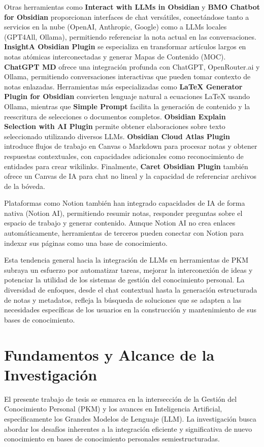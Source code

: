 Otras herramientas como \textbf{Interact with LLMs in Obsidian} y \textbf{BMO Chatbot for Obsidian} proporcionan interfaces de chat versátiles, conectándose tanto a servicios en la nube (OpenAI, Anthropic, Google) como a LLMs locales (GPT4All, Ollama), permitiendo referenciar la nota actual en las conversaciones. \textbf{InsightA Obsidian Plugin} se especializa en transformar artículos largos en notas atómicas interconectadas y generar Mapas de Contenido (MOC). \textbf{ChatGPT MD} ofrece una integración profunda con ChatGPT, OpenRouter.ai y Ollama, permitiendo conversaciones interactivas que pueden tomar contexto de notas enlazadas. Herramientas más especializadas como \textbf{LaTeX Generator Plugin for Obsidian} convierten lenguaje natural a ecuaciones LaTeX usando Ollama, mientras que \textbf{Simple Prompt} facilita la generación de contenido y la reescritura de selecciones o documentos completos. \textbf{Obsidian Explain Selection with AI Plugin} permite obtener elaboraciones sobre texto seleccionado utilizando diversos LLMs. \textbf{Obsidian Cloud Atlas Plugin} introduce flujos de trabajo en Canvas o Markdown para procesar notas y obtener respuestas contextuales, con capacidades adicionales como reconocimiento de entidades para crear wikilinks. Finalmente, \textbf{Caret Obsidian Plugin} también ofrece un Canvas de IA para chat no lineal y la capacidad de referenciar archivos de la bóveda.

Plataformas como Notion también han integrado capacidades de IA de forma nativa (Notion AI), permitiendo resumir notas, responder preguntas sobre el espacio de trabajo y generar contenido. Aunque Notion AI no crea enlaces automáticamente, herramientas de terceros pueden conectar con Notion para indexar sus páginas como una base de conocimiento.

Esta tendencia general hacia la integración de LLMs en herramientas de PKM subraya un esfuerzo por automatizar tareas, mejorar la interconexión de ideas y potenciar la utilidad de los sistemas de gestión del conocimiento personal. La diversidad de enfoques, desde el chat contextual hasta la generación estructurada de notas y metadatos, refleja la búsqueda de soluciones que se adapten a las necesidades específicas de los usuarios en la construcción y mantenimiento de sus bases de conocimiento.

\section{Fundamentos y Alcance de la Investigación}
\label{sec:fundamentos_investigacion}
El presente trabajo de tesis se enmarca en la intersección de la Gestión del Conocimiento Personal (PKM) y los avances en Inteligencia Artificial, específicamente los Grandes Modelos de Lenguaje (LLM). La investigación busca abordar los desafíos inherentes a la integración eficiente y significativa de nuevo conocimiento en bases de conocimiento personales semiestructuradas.


